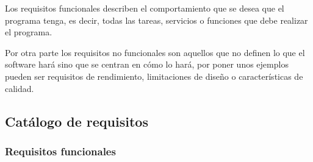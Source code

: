 
Los requisitos funcionales describen el comportamiento que se desea que el programa tenga, es decir, todas las tareas, servicios o funciones que debe realizar el programa. %

Por otra parte los requisitos no funcionales son aquellos que no definen lo que el software hará sino que se centran en cómo lo hará, por poner unos ejemplos pueden ser requisitos de rendimiento, limitaciones de diseño o características de calidad.  %

\subsection{Catálogo de requisitos}

\subsubsection{Requisitos funcionales}


